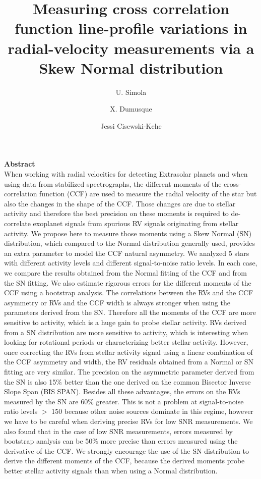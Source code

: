 \documentclass[11pt, oneside]{article}
\title{Measuring cross correlation function line-profile variations in radial-velocity measurements via a Skew Normal distribution}
\author{U. Simola
	    \and X. Dumusque
	    \and Jessi Cisewski-Kehe
	    }
\begin{document}
\maketitle

{\bf Abstract}\\
{When working with radial velocities for detecting Extrasolar planets and when using data from stabilized spectrographs,
the different moments of the cross-correlation function (CCF) are used to measure the radial velocity of the star but also the changes in the shape of the CCF. Those changes are due to stellar activity and therefore the best precision on these moments is required to de-correlate exoplanet signals from spurious RV signals originating from stellar activity.}
{We propose here to measure those moments using a Skew Normal (SN) distribution, which compared to the Normal distribution generally used, provides an extra parameter to model the CCF natural asymmetry.}
{We analyzed 5 stars with different activity levels and different signal-to-noise ratio levels. In each case, we compare the results obtained from the Normal fitting of the CCF and from the SN fitting. We also estimate rigorous errors for the different moments of the CCF using a bootstrap analysis.}
{The correlations between the RVs and the CCF asymmetry or RVs and the CCF width is always stronger when using the parameters derived from the SN. Therefore all the moments of the CCF are more sensitive to activity, which is a huge gain to probe stellar activity. RVs derived from a SN distribution are more sensitive to activity, which is interesting when looking for rotational periods or characterizing better stellar activity. However, once correcting the RVs from stellar activity signal using a linear combination of the CCF asymmetry and width, the RV residuals obtained from a Normal or SN fitting are very similar. The precision on the asymmetric parameter derived from the SN is also 15\% better than the one derived on the common Bisector Inverse Slope Span (BIS SPAN). Besides all these advantages, the errors on the RVs measured by the SN are 60\% greater. This is not a problem at signal-to-noise ratio levels $>$ 150 because other noise sources dominate in this regime, however we have to be careful when deriving precise RVs for low SNR measurements. We also found that in the case of low SNR measurements, errors measured by bootstrap analysis can be 50\% more precise than errors measured using the derivative of the CCF.}
{We strongly encourage the use of the SN distribution to derive the different moments of the CCF, because the derived moments probe better stellar activity signals than when using a Normal distribution.}
\end{document}
